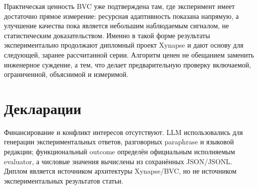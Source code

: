 \documentclass[11pt]{article}
\begin{document}
Практическая ценность BVC уже подтверждена там, где эксперимент имеет
достаточно прямое измерение: ресурсная адаптивность показана
напрямую, а улучшение качества пока является небольшим наблюдаемым сигналом,
не статистическим доказательством. Именно в такой форме результаты
экспериментально продолжают дипломный проект Xynapse
\cite{khalilov2026} и дают основу для следующей, заранее рассчитанной серии.
Алгоритм ценен не обещанием заменить инженерное суждение, а тем, что делает
предварительную проверку включаемой, ограниченной, объяснимой и измеримой.

\section*{Декларации}

Финансирование и конфликт интересов отсутствуют. LLM использовались для
генерации экспериментальных ответов, разговорных paraphrase и языковой
редакции; функциональный outcome определён официальным исполняемым evaluator,
а числовые значения вычислены из сохранённых JSON/JSONL. Диплом
\cite{khalilov2026} является источником архитектуры Xynapse/BVC, но не
источником экспериментальных результатов статьи.

\clearpage
\printbibliography[title={Литература}]
\end{document}
